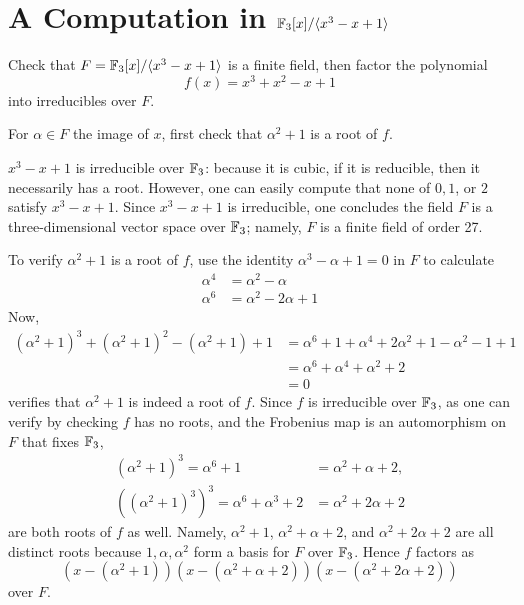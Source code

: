 \documentclass[12pt]{article}
\begin{document}
\section{A Computation in \texorpdfstring{$\mathbb{F}_3[x]/\langle x^3-x+1\rangle$}{F\_3[x]/(x\^{}3-x+1)}}
 
Check that $F = \mathbb{F}_3[x]/\langle x^3 - x + 1\rangle$ is a finite field, then factor the polynomial
\[
  f(x) = x^3 + x^2 - x + 1
\]
into irreducibles over $F$.
 
\begin{hint}
For $\alpha \in F$ the image of $x$, first check that $\alpha^2 + 1$ is a root of $f$.
\end{hint}

\noindent\dotfill

$x^3 - x + 1$ is irreducible over $\mathbb{F}_3$: 
because it is cubic, if it is reducible, then it necessarily has a root. 
However, one can easily compute that none of $0, 1$, or $2$ satisfy $x^3 - x + 1$. 
Since $x^3 - x + 1$ is irreducible, one concludes the field $F$ is a three-dimensional vector space over $\mathbb{F}_3$;
namely, $F$ is a finite field of order 27.  

To verify $\alpha^2 + 1$ is a root of $f$, use the identity $\alpha^3 - \alpha + 1 = 0$ in $F$ to calculate  
\begin{align*}
  \alpha^4 & = \alpha^2 - \alpha \\ 
  \alpha^6 & = \alpha^2 - 2\alpha + 1
\end{align*}
Now, 
\newcommand{\myroot}{\alpha^2 + 1}
\begin{align*}
  (\myroot)^3 + (\myroot)^2 - (\myroot) + 1 
  & = \alpha^6 + 1 + \alpha^4 + 2\alpha^2 + 1 - \alpha^2 - 1 + 1 \\ 
  & = \alpha^6 + \alpha^4 + \alpha^2 +  2 \\ 
  & = 0 
\end{align*}
verifies that $\alpha^2 + 1$ is indeed a root of $f$.
Since $f$ is irreducible over $\mathbb{F}_3$, as one can verify by checking $f$ has no roots, and the Frobenius map is an automorphism on $F$ that fixes $\mathbb{F}_3$, 
\begin{align*}
  (\alpha^2 + 1)^3 = \alpha^6 + 1 & = \alpha^2 + \alpha + 2, \\ 
  ((\alpha^2 + 1)^3)^3 = \alpha^6 + \alpha^3 + 2 & = \alpha^2 + 2\alpha + 2
\end{align*}
are both roots of $f$ as well.  
Namely, $\alpha^2 + 1$, $\alpha^2 + \alpha + 2$, and $\alpha^2 + 2\alpha + 2$ are all distinct roots because $1, \alpha, \alpha^2$ form a basis for $F$ over $\mathbb{F}_3$. 
Hence $f$ factors as 
$$(x - (\alpha^2 + 1))(x - (\alpha^2 + \alpha + 2))(x - (\alpha^2 + 2\alpha + 2))$$
over $F$. 
 
\end{document}
